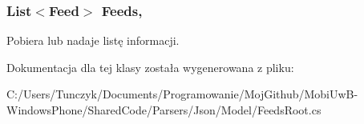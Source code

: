 \subsubsection[{Feeds}]{\setlength{\rightskip}{0pt plus 5cm}List$<$Feed$>$ Feeds\hspace{0.3cm}{\ttfamily [get]}, {\ttfamily [set]}}\label{a00020_a2ec7eb8b2ee1b26d7393523e3e9f7f10}


Pobiera lub nadaje listę informacji. 



Dokumentacja dla tej klasy została wygenerowana z pliku\+:\begin{DoxyCompactItemize}
\item 
C\+:/\+Users/\+Tunczyk/\+Documents/\+Programowanie/\+Moj\+Github/\+Mobi\+Uw\+B-\/\+Windows\+Phone/\+Shared\+Code/\+Parsers/\+Json/\+Model/Feeds\+Root.\+cs\end{DoxyCompactItemize}
